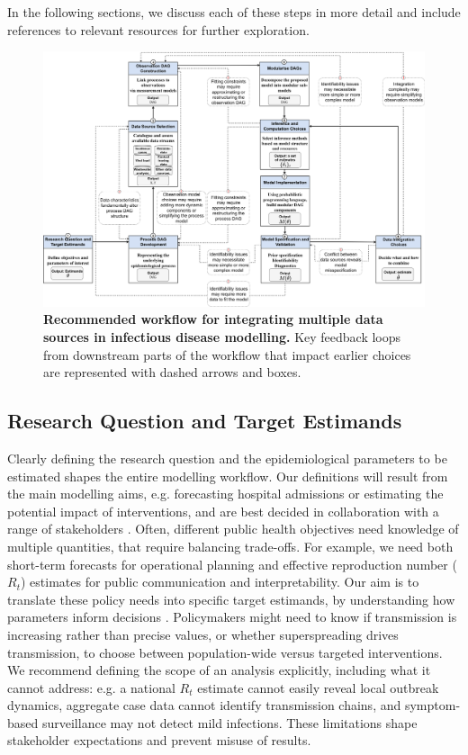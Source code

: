 \documentclass{article}
\begin{document}
In the following sections, we discuss each of these steps in more detail and include references to relevant resources for further exploration.

\begin{landscape}
\begin{figure}[htbp]
    \centering
    \includegraphics[width = 1 \textwidth]{figures/restructured_workflow.drawio.png}
    \caption{\textbf{Recommended workflow for integrating multiple data sources in infectious disease modelling.} Key feedback loops from downstream parts of the workflow that impact earlier choices are represented with dashed arrows and boxes.}
    \label{fig:workflow}
\end{figure}
\end{landscape}

\subsection{Research Question and Target Estimands} \label{sec:research-question}

Clearly defining the research question and the epidemiological parameters to be estimated shapes the entire modelling workflow. Our definitions will result from the main modelling aims, e.g. forecasting hospital admissions or estimating the potential impact of interventions, and are best decided in collaboration with a range of stakeholders \citep{marshall2024when}.
Often, different public health objectives need knowledge of multiple quantities, that require balancing trade-offs. For example, we need both short-term forecasts for operational planning and effective reproduction number ($R_t$) estimates for public communication and interpretability. Our aim is to translate these policy needs into specific target estimands, by understanding how parameters inform decisions \citep{nicholson2022interoperability, gip-2024-ru}. Policymakers might need to know if transmission is increasing rather than precise values, or whether superspreading drives transmission, to choose between population-wide versus targeted interventions. We recommend defining the scope of an analysis explicitly, including what it cannot address: e.g. a national $R_t$ estimate cannot easily reveal local outbreak dynamics, aggregate case data cannot identify transmission chains, and symptom-based surveillance may not detect mild infections.
These limitations shape stakeholder expectations and prevent misuse of results.
\end{document}
